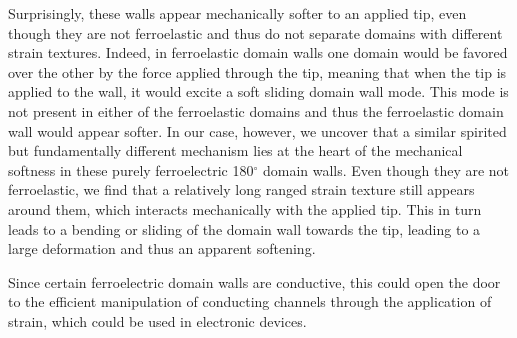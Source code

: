 Surprisingly, these walls appear mechanically softer to an applied tip, even though they are not ferroelastic and thus do not separate domains with different strain textures.
Indeed, in ferroelastic domain walls one domain would be favored over the other by the force applied through the tip, meaning that when the tip is applied to the wall, it would excite a soft sliding domain wall mode.
This mode is not present in either of the ferroelastic domains and thus the ferroelastic domain wall would appear softer.
In our case, however, we uncover that a similar spirited but fundamentally different mechanism lies at the heart of the mechanical softness in these purely ferroelectric 180$^\circ$ domain walls.
Even though they are not ferroelastic, we find that a relatively long ranged strain texture still appears around them, which interacts mechanically with the applied tip.
This in turn leads to a bending or sliding of the domain wall towards the tip, leading to a large deformation and thus an apparent softening.

Since certain ferroelectric domain walls are conductive, this could open the door to the efficient manipulation of conducting channels through the application of strain, which could be used in electronic devices.
